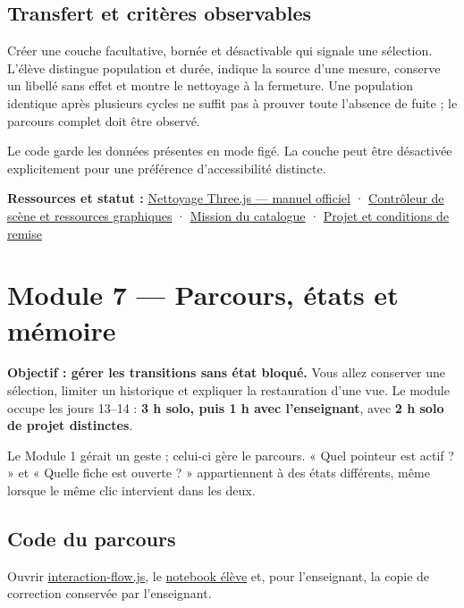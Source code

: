 \documentclass[
  canadien,
  11pt,
  a4paper,
]{report}
\begin{document}
\section{Transfert et critères
observables}\label{transfert-et-crituxe8res-observables-5}

Créer une couche facultative, bornée et désactivable qui signale une
sélection. L'élève distingue population et durée, indique la source
d'une mesure, conserve un libellé sans effet et montre le nettoyage à la
fermeture. Une population identique après plusieurs cycles ne suffit pas
à prouver toute l'absence de fuite ; le parcours complet doit être
observé.

Le code garde les données présentes en mode figé. La couche peut être
désactivée explicitement pour une préférence d'accessibilité distincte.

\textbf{Ressources et statut :}
\href{https://threejs.org/manual/\#en/cleanup}{Nettoyage Three.js ---
manuel officiel} ·
\href{../../frontend/module-3/scene-controller.js}{Contrôleur de scène
et ressources graphiques} ·
\href{../../../../../packages/learning/src/catalog.ts}{Mission du
catalogue} · \href{../../PROJECT.md}{Projet et conditions de remise}

\chapter{Module 7 --- Parcours, états et
mémoire}\label{module-7-parcours-uxe9tats-et-muxe9moire}

\textbf{Objectif : gérer les transitions sans état bloqué.} Vous allez
conserver une sélection, limiter un historique et expliquer la
restauration d'une vue. Le module occupe les jours 13--14 : \textbf{3 h
solo, puis 1 h avec l'enseignant}, avec \textbf{2 h solo de projet
distinctes}.

Le Module 1 gérait un geste ; celui-ci gère le parcours. « Quel pointeur
est actif ? » et « Quelle fiche est ouverte ? » appartiennent à des
états différents, même lorsque le même clic intervient dans les deux.

\section{Code du parcours}\label{code-du-parcours}

Ouvrir
\href{../../frontend/module-7/interaction-flow.js}{interaction-flow.js},
le \href{../../notebooks/module-7.ipynb}{notebook élève} et, pour
l'enseignant, la copie de correction conservée par l'enseignant.
\end{document}
